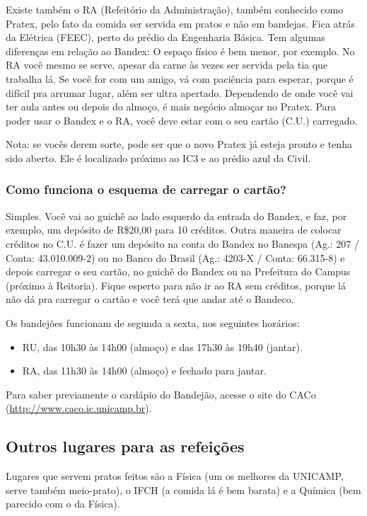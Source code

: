 \documentclass[a4paper,10pt, twocolumn]{article}
\begin{document}
Existe também o RA (Refeitório da Administração), também conhecido como Pratex,
pelo fato da comida ser servida em pratos e não em bandejas. Fica atrás da
Elétrica (FEEC), perto do prédio da Engenharia Básica. Tem algumas diferenças em
relação ao Bandex: O espaço físico é bem menor, por exemplo. No RA você mesmo se
serve, apesar da carne às vezes ser servida pela tia que trabalha lá. Se você
for com um amigo, vá com paciência para esperar, porque é difícil pra arrumar
lugar, além ser ultra apertado. Dependendo de onde você vai ter aula antes ou
depois do almoço, é mais negócio almoçar no Pratex. Para poder usar o Bandex
e o RA, você deve estar com o seu cartão (C.U.) carregado.

Nota: se vocês derem sorte, pode ser que o novo Pratex já esteja pronto e tenha
sido aberto. Ele é localizado próximo ao IC3 e ao prédio azul da Civil.

\subsubsection{Como funciona o esquema de carregar o cartão?}
Simples. Você vai ao guichê ao lado esquerdo da entrada do Bandex, e faz, por
exemplo, um depósito de R\$20,00 para 10 créditos. Outra maneira de colocar
créditos no C.U. é fazer um depósito na conta do Bandex no Banespa (Ag.: 207
/ Conta: 43.010.009-2) ou no Banco do Brasil (Ag.: 4203-X / Conta: 66.315-8)
e depois carregar o seu cartão, no guichê do Bandex ou na Prefeitura do Campus
(próximo à Reitoria). Fique esperto para não ir ao RA sem créditos, porque lá
não dá pra carregar o cartão e você terá que andar até o Bandeco.

Os bandejões funcionam de segunda a sexta, nos seguintes horários:

\begin{itemize}
\item  RU, das 10h30 às 14h00 (almoço) e das 17h30 às 19h40 (jantar).
\item  RA, das 11h30 às 14h00 (almoço) e fechado para jantar.
\end{itemize}
Para saber previamente o cardápio do Bandejão, acesse o site do CACo (\url{http://www.caco.ic.unicamp.br}).

\subsection{Outros lugares para as refeições}

Lugares que servem pratos feitos são a Física (um os melhores da UNICAMP, serve
também meio-prato), o IFCH (a comida lá é bem barata) e a Química (bem parecido
com o da Física).
\end{document}
